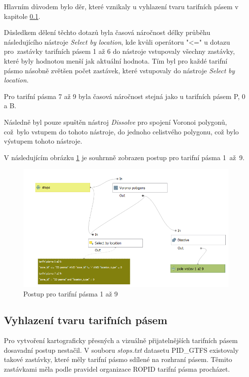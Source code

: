 Hlavním důvodem bylo  děr, které vznikaly u vyhlazení tvaru tarifních pásem v kapitole \ref{vyhlazeni}.  

Důsledkem dělení těchto dotazů byla časová náročnost délky průběhu následujícího nástroje \textit{Select by location}, 
kde kvůli operátoru "<=" u dotazu pro~zastávky tarifních pásem 1 až 6 do nástroje vstupovaly všechny zastávky, 
které byly hodnotou  menší jak aktuální hodnota. Tím byl pro každé tarifní pásmo násobně zvětšen počet zastávek,
které vstupovaly do nástroje \textit{Select by location}.

Pro tarifní pásma 7 až 9 byla časová náročnost stejná jako u tarifních pásem P, 0 a B.

Následně byl pouze spuštěn nástroj \textit{Dissolve} pro spojení Voronoi polygonů, což~bylo vstupem do tohoto nástroje,
do jednoho celistvého polygonu, což bylo výstupem tohoto nástroje.

V následujícím obrázku \ref{fig:postup-voronoi-1az9} je souhrnně zobrazen postup pro tarifní pásma 1~až~9.

\begin{figure}[H] \centering
    \includegraphics[width=400pt]{./pictures/postup-voronoi-1az9.png}
    \caption[Postup pro tarifní pásma 1 až 9]{Postup pro tarifní pásma 1 až 9}
	\label{fig:postup-voronoi-1az9}              
\end{figure}

\subsection{Vyhlazení tvaru tarifních pásem}
\label{vyhlazeni}

Pro vytvoření kartograficky přesných a vizuálně přijatelnějších tarifních pásem dosa\-vadní postup nestačil.
V souboru \textit{stops.txt} datasetu PID\_GTFS existovaly takové zastávky, které měly tarifní pásmo sdílené
na rozhraní pásem. Těmito zastávkami měla podle pravidel organizace ROPID tarifní pásma procházet.

